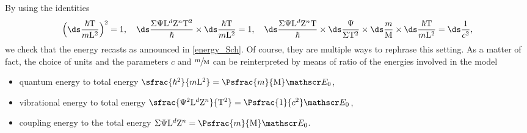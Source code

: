 By using the identities
\[
\Bigl(\ds\frac{\hbar\mathrm T}{m\mathrm L^2}\Bigr)^2=1,\quad
\ds\frac{ \Sigma \Psi \mathrm L^d\mathrm Z^n \mathrm T^2}{\hbar}\times \ds\frac {\hbar\mathrm T}{m\mathrm L^2}
=1,\quad
\ds\frac{\Sigma\Psi\mathrm L^d\mathrm Z^n\mathrm T}{\hbar }
\times\ds\frac{\Psi}{\Sigma \mathrm T^2}\times\ds\frac m{\mathrm M} \times \ds\frac{\hbar \mathrm T}{m\mathrm L^2}
=\ds\frac{1}{c^2},
\]
we check that the energy
recasts as announced in \eqref{energy_Sch}.
Of course, they are multiple ways to rephrase
this setting. As a matter of fact, the choice of units and the parameters $c$ and $\sfrac{m}{\mathrm M}$ can be
reinterpreted by means of ratio of the energies involved in the model
\begin{itemize}
\item quantum energy to total energy $\sfrac{\hbar^2}{m\mathrm L^2}
=\Psfrac{m}{\mathrm M}\mathscr E_0$,
\item vibrational energy to total energy $\sfrac{\Psi^2\mathrm L^d\mathrm Z^n}{\mathrm T^2} =
\Psfrac{1}{c^2}\mathscr E_0$,
\item coupling energy to the total energy $\Sigma \Psi \mathrm L^d\mathrm Z^n=\Psfrac{m}{\mathrm M}\mathscr E_0$.
\end{itemize}
